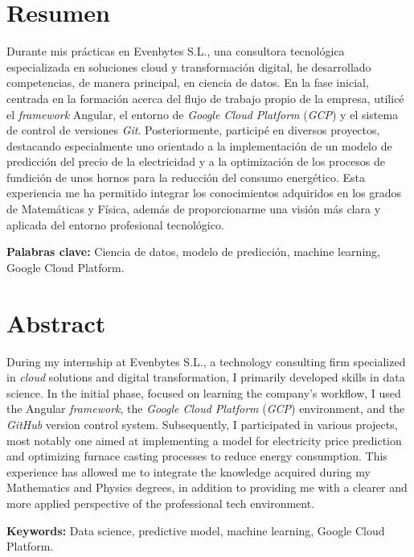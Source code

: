 \section*{Resumen}

Durante mis prácticas en Evenbytes S.L., una consultora tecnológica especializada en soluciones cloud y transformación digital, he desarrollado competencias, de manera principal, en ciencia de datos. En la fase inicial, centrada en la formación acerca del flujo de trabajo propio de la empresa, utilicé el \textit{framework} Angular, el entorno de \textit{Google Cloud Platform} (\textit{GCP}) y el sistema de control de versiones \textit{Git}. Posteriormente, participé en diversos proyectos, destacando especialmente uno orientado a la implementación de un modelo de predicción del precio de la electricidad y a la optimización de los procesos de fundición de unos hornos para la reducción del consumo energético. Esta experiencia me ha permitido integrar los conocimientos adquiridos en los grados de Matemáticas y Física, además de proporcionarme una visión más clara y aplicada del entorno profesional tecnológico.

\vspace{1cm}
\noindent\textbf{Palabras clave:} Ciencia de datos, modelo de predicción, machine learning, Google Cloud Platform.
 

\section*{Abstract}

During my internship at Evenbytes S.L., a technology consulting firm specialized in \textit{cloud} solutions and digital transformation, I primarily developed skills in data science. In the initial phase, focused on learning the company's workflow, I used the Angular \textit{framework}, the \textit{Google Cloud Platform} (\textit{GCP}) environment, and the \textit{GitHub} version control system. Subsequently, I participated in various projects, most notably one aimed at implementing a model for electricity price prediction and optimizing furnace casting processes to reduce energy consumption. This experience has allowed me to integrate the knowledge acquired during my Mathematics and Physics degrees, in addition to providing me with a clearer and more applied perspective of the professional tech environment.

\vspace{1cm}
\noindent\textbf{Keywords:} Data science,  predictive model, machine learning, Google Cloud Platform.

